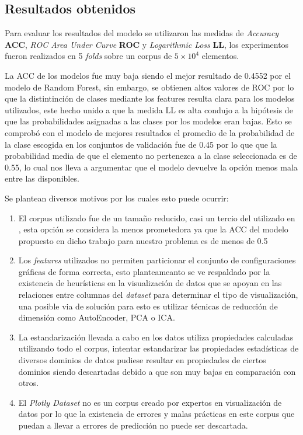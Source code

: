\documentclass[a4paper,10pt,twocolumn]{article}
\begin{document}
	\subsection{Resultados obtenidos}

	Para evaluar los resultados del modelo se utilizaron las medidas de \textit{Accuracy} \textbf{ACC},
	\textit{ROC Area Under Curve} \textbf{ROC} y \textit{Logarithmic Loss} \textbf{LL}, los experimentos
	fueron realizados en  5 \textit{folds} sobre un corpus de $5 \times 10^4$ elementos.
	
	La ACC de los modelos fue muy baja siendo el mejor resultado de 0.4552 por el modelo de Random Forest, 
	sin embargo, se obtienen altos valores de ROC por lo que la distintinci\'on de clases mediante los features
	resulta clara para los modelos utilizados, este hecho unido a que la medida LL es alta condujo a la hip\'otesis 
	de que las probabilidades asignadas a las clases por los modelos eran bajas.
	Esto se comprob\'o con el modelo de mejores resultados el promedio de la probabilidad de la clase escogida en los conjuntos de 
	validaci\'on fue de 0.45 por lo que que la probabilidad media de que el elemento no pertenezca a la clase seleccionada
	es de 0.55, lo cual nos lleva a argumentar que el modelo devuelve la opci\'on menos mala entre las disponibles.
	
	Se plantean diversos motivos por los cuales esto puede ocurrir:

	\begin{enumerate}
		\item El corpus utilizado fue de un tamaño reducido, casi un tercio del utilizado en \cite{hu2019vizml}, esta opci\'on se considera
		la menos prometedora ya que la ACC del modelo propuesto en dicho trabajo para nuestro problema es de menos de 0.5
		\item Los \textit{features} utilizados no permiten particionar el conjunto de configuraciones gr\'aficas de forma correcta, esto planteameanto
		se ve respaldado por la existencia de heur\'isticas en la visualizaci\'on de datos que se apoyan en las relaciones entre columnas del \textit{dataset}
		para determinar el tipo de visualizaci\'on, una posible via de soluci\'on para esto es utilizar t\'ecnicas de reducci\'on de dimensi\'on como AutoEncoder, PCA o ICA.
		\item La estandarizaci\'on llevada a cabo en los datos utiliza propiedades calculadas utilizando todo el corpus, intentar estandarizar las propiedades
		estad\'isticas de diversos dominios de datos pudiese resultar en propiedades de ciertos dominios siendo descartadas debido a que son muy bajas en comparaci\'on con otros.
		\item El \textit{Plotly Dataset} no es un corpus creado por expertos en visualizaci\'on de datos por lo que la existencia de errores y malas pr\'acticas en este corpus que 
		puedan a llevar a errores de predicci\'on no puede ser descartada.
	\end{enumerate}
\end{document}
